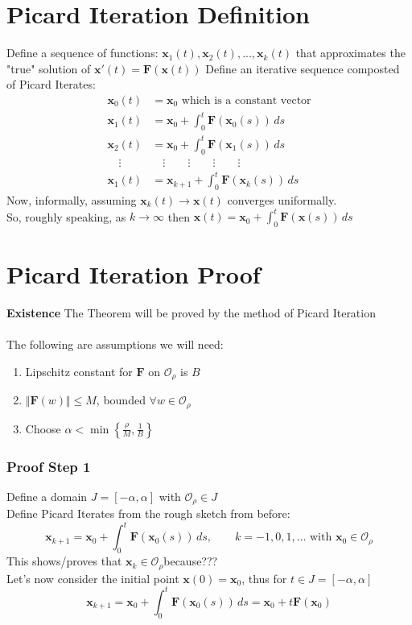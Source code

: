 \documentclass[12pt]{article}
\begin{document}
\section*{Picard Iteration Definition}
Define a sequence of functions: $\mathbf{x}_1(t), \mathbf{x}_2(t),...,\mathbf{x}_k(t)$ that approximates the "true" solution of $\mathbf{x}'(t) = \mathbf{F}(\mathbf{x}(t))$
Define an iterative sequence composted of Picard Iterates:
\begin{align*}
    \mathbf{x}_0(t) &= \mathbf{x}_0 \text{ which is a constant vector} \\
    \mathbf{x}_1(t) &= \mathbf{x}_0 + \int_{0}^{t} \mathbf{F}(\mathbf{x}_0(s)) \, ds \\
    \mathbf{x}_2(t) &= \mathbf{x}_0 + \int_{0}^{t} \mathbf{F}(\mathbf{x}_1(s)) \, ds \\
    \quad \vdots \quad & \quad \vdots \quad \quad \vdots \quad \quad \vdots \quad \quad \vdots \\
    \mathbf{x}_1(t) &= \mathbf{x}_{k+1} + \int_{0}^{t} \mathbf{F}(\mathbf{x}_k(s)) \, ds
\end{align*}
Now, informally, assuming $\mathbf{x}_k(t) \rightarrow \mathbf{x}(t)$ converges uniformally.\\
So, roughly speaking, as $k \rightarrow \infty$ then $\displaystyle \mathbf{x}(t) = \mathbf{x}_0 + \int_{0}^{t} \mathbf{F}(\mathbf{x}(s)) \, ds$

\vspace{10cm}
\section*{Picard Iteration Proof}
\textbf{Existence} The Theorem will be proved by the method of Picard Iteration\\\\
The following are assumptions we will need:
\begin{enumerate}
    \item Lipschitz constant for $\mathbf{F}$ on $\mathcal{O}_\rho$ is $B$
    \item $\Vert \mathbf{F}(w) \Vert \leq M$, bounded $\forall w \in \mathcal{O}_\rho$ 
    \item Choose $\alpha < \min \left\{ \frac{\rho}{M}, \frac{1}{B} \right\}$
\end{enumerate}

\subsubsection*{Proof Step 1}
Define a domain $J = [-\alpha, \alpha]$ with $\mathcal{O}_\rho \in J$ \\
Define Picard Iterates from the rough sketch from before: 
$$\mathbf{x}_{k+1} = \mathbf{x}_0 + \int_{0}^{t} \mathbf{F}(\mathbf{x}_0(s)) \, ds,
\quad \quad k=-1,0,1,\ldots \text{ with } \mathbf{x}_0 \in \mathcal{O}_\rho$$
This shows/proves that $\mathbf{x}_k \in \mathcal{O}_\rho $because??? \\
Let's now consider the initial point $\mathbf{x}(0) = \mathbf{x}_0$, thus for $t \in J=[-\alpha,\alpha]$
$$\mathbf{x}_{k+1} = \mathbf{x}_0 + \int_{0}^{t} \mathbf{F}(\mathbf{x}_0(s)) \, ds
= \mathbf{x}_0 + t\mathbf{F}(\mathbf{x}_0)$$
\end{document}
